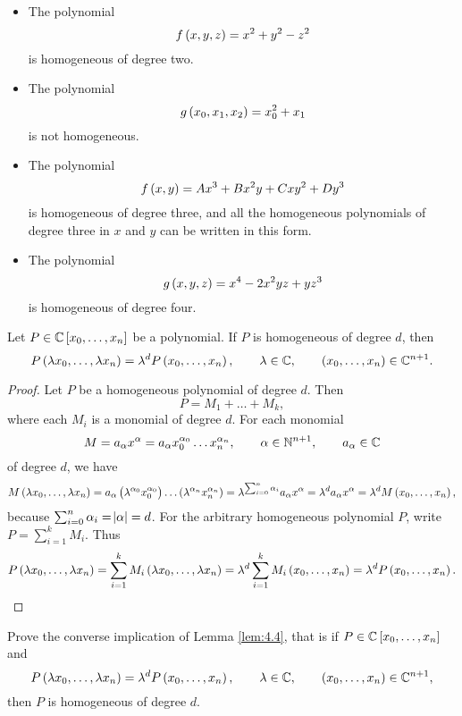\begin{example}
\hfill
\begin{itemize}
\item The polynomial
$$ f\br{x, y, z} = x^2 + y^2 - z^2 $$
is homogeneous of degree two.
\item The polynomial
$$ g\br{x_0, x_1, x_2} = x_0^2 + x_1 $$
is not homogeneous.
\item The polynomial
$$ f\br{x, y} = Ax^3 + Bx^2y + Cxy^2 + Dy^3 $$
is homogeneous of degree three, and all the homogeneous polynomials of degree three in $ x $ and $ y $ can be written in this form.
\item The polynomial
$$ g\br{x, y, z} = x^4 - 2x^2yz + yz^3 $$
is homogeneous of degree four.
\end{itemize}
\end{example}

\pagebreak

\begin{lemma}
\label{lem:4.4}
Let $ P \in \CC\sbr{x_0, \dots, x_n} $ be a polynomial. If $ P $ is homogeneous of degree $ d $, then
$$ P\br{\lambda x_0, \dots, \lambda x_n} = \lambda^dP\br{x_0, \dots, x_n}, \qquad \lambda \in \CC, \qquad \br{x_0, \dots, x_n} \in \CC^{n + 1}. $$
\end{lemma}

\begin{proof}
Let $ P $ be a homogeneous polynomial of degree $ d $. Then
$$ P = M_1 + \dots + M_k, $$
where each $ M_i $ is a monomial of degree $ d $. For each monomial
$$ M = a_\alpha x^\alpha = a_\alpha x_0^{\alpha_0} \dots x_n^{\alpha_n}, \qquad \alpha \in \mathbb{N}^{n + 1}, \qquad a_\alpha \in \mathbb{C} $$
of degree $ d $, we have
$$ M\br{\lambda x_0, \dots, \lambda x_n} = a_\alpha\br{\lambda^{\alpha_0}x_0^{\alpha_0}} \dots \br{\lambda^{\alpha_n}x_n^{\alpha_n}} = \lambda^{\sum_{i = 0}^n \alpha_i}a_\alpha x^\alpha = \lambda^da_\alpha x^\alpha = \lambda^dM\br{x_0, \dots, x_n}, $$
because $ \sum_{i = 0}^n \alpha_i = \abs{\alpha} = d $. For the arbitrary homogeneous polynomial $ P $, write $ P = \sum_{i = 1}^k M_i $. Thus
$$ P\br{\lambda x_0, \dots, \lambda x_n} = \sum_{i = 1}^k M_i\br{\lambda x_0, \dots, \lambda x_n} = \lambda^d\sum_{i = 1}^k M_i\br{x_0, \dots, x_n} = \lambda^dP\br{x_0, \dots, x_n}. $$
\end{proof}

\begin{exercise**}
Prove the converse implication of Lemma \ref{lem:4.4}, that is if $ P \in \CC\sbr{x_0, \dots, x_n} $ and
$$ P\br{\lambda x_0, \dots, \lambda x_n} = \lambda^dP\br{x_0, \dots, x_n}, \qquad \lambda \in \CC, \qquad \br{x_0, \dots, x_n} \in \CC^{n + 1}, $$
then $ P $ is homogeneous of degree $ d $.
\end{exercise**}

